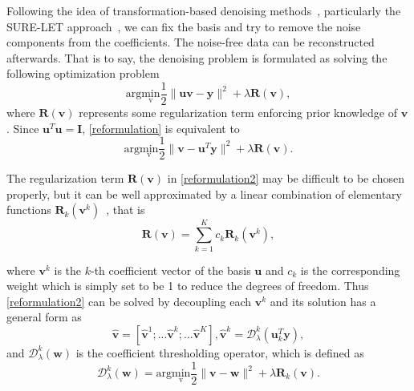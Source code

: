 \documentclass[10pt,twocolumn,letterpaper]{article}
\begin{document}
Following the idea of transformation-based denoising methods~\cite{starck2002curvelet,dabov2007image}, particularly the SURE-LET approach~\cite{blu2007sure}, we can fix the basis and try to remove the noise components from the coefficients. The noise-free data can be reconstructed afterwards. That is to say, the denoising problem is formulated as solving the following optimization problem
\vspace{-5pt}
\begin{equation}
\label{reformulation}
    \mathrm{arg}\underset{\mathrm{v}}{\mathrm{min}}\frac{1}{2}\|\mathrm{\mathbf{u}}\mathrm{\mathbf{v}} - \mathrm{\mathbf{y}}\|^2 + \lambda \mathbf{R}(\mathrm{\mathbf{v}}),
\end{equation} where $\mathbf{R}(\mathrm{\mathbf{v}})$ represents some regularization term enforcing prior knowledge of $\mathrm{\mathbf{v}}$. Since $\mathrm{\mathbf{u}}^T\mathrm{\mathbf{u}}=\mathrm{\mathbf{I}}$, \cref{reformulation} is equivalent to 
\vspace{-5pt}
\begin{equation}
\label{reformulation2}
    \mathrm{arg}\underset{\mathrm{v}}{\mathrm{min}}\frac{1}{2}\|\mathrm{\mathbf{v}} - \mathrm{\mathbf{u}}^T\mathrm{\mathbf{y}}\|^2 + \lambda \mathbf{R}(\mathrm{\mathbf{v}}).
\end{equation} 

The regularization term $\mathbf{R}(\mathrm{\mathbf{v}})$ in \cref{reformulation2} may be difficult to be chosen properly, but it can be well approximated by a linear combination of elementary functions $\mathbf{R}_k(\mathrm{\mathbf{v}}^k)$~\cite{blu2007sure,li2017pure}, that is 
\begin{equation}
    \mathbf{R}(\mathrm{\mathbf{v}}) = \sum_{k=1}^K c_k \mathbf{R}_k(\mathrm{\mathbf{v}}^k),
\end{equation} \vspace{-5pt} 

where $\mathrm{\mathbf{v}}^k$ is the $k$-th coefficient vector of the basis $\mathrm{\mathbf{u}}$ and $c_k$ is the corresponding weight which is simply set to be 1 to reduce the degrees of freedom. Thus \cref{reformulation2} can be solved by decoupling each $\mathrm{\mathbf{v}}^k$ and its solution has a general form as
\begin{equation}
    \label{solution}
    \mathrm{\mathbf{\hat{v}}} = [\mathrm{\mathbf{\hat{v}}}^1; ... \mathrm{\mathbf{\hat{v}}}^k; ... \mathrm{\mathbf{\hat{v}}}^K], \mathrm{\mathbf{\hat{v}}}^k = \mathcal{D}_{\lambda}^k\left(\mathrm{\mathbf{u}}_k^T\mathrm{\mathbf{y}}\right),
\end{equation} and $\mathcal{D}_{\lambda}^k \left(\mathrm{\mathbf{w}}\right)$ is the coefficient thresholding operator, which is defined as 
\vspace{-5pt}
    \begin{equation}
    \label{finalproblem}
        \mathcal{D}_{\lambda}^k \left(\mathrm{\mathbf{w}}\right)= \mathrm{arg}\underset{\mathrm{v}}{\mathrm{min}}\frac{1}{2}\|\mathrm{\mathbf{v}} - \mathrm{\mathbf{w}}\|^2 + \lambda \mathbf{R}_k(\mathrm{\mathbf{v}}).
    \end{equation}
    \vspace{-13pt}
\end{document}
